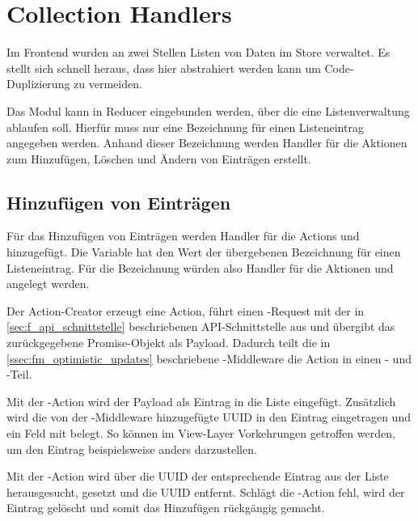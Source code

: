 \section{Collection Handlers}
\label{sec:f_collection_handlers}

Im Frontend wurden an zwei Stellen Listen von Daten im Store verwaltet.  Es
stellt sich schnell heraus, dass hier abstrahiert werden kann um
Code-Duplizierung zu vermeiden.

Das Modul  kann in Reducer eingebunden werden, über
die eine Listenverwaltung ablaufen soll.  Hierfür muss nur eine Bezeichnung für
einen Listeneintrag angegeben werden.  Anhand dieser Bezeichnung werden Handler
für die Aktionen zum Hinzufügen, Löschen und Ändern von Einträgen erstellt.

\subsection{Hinzufügen von Einträgen}
\label{ssec:fc_hinzufuegen_von_eintraegen}

Für das Hinzufügen von Einträgen werden Handler für die Actions
 und 
hinzugefügt.  Die Variable  hat den Wert der übergebenen
Bezeichnung für einen Listeneintrag.  Für die Bezeichnung  würden
also Handler für die Aktionen  und
 angelegt werden.

Der Action-Creator erzeugt eine  Action, führt einen
-Request mit der in \cref{sec:f_api_schnittstelle} beschriebenen
API-Schnittstelle aus und übergibt das zurückgegebene Promise-Objekt als
Payload.  Dadurch teilt die in \cref{ssec:fm_optimistic_updates} beschriebene
-Middleware die Action in einen - und
-Teil.

Mit der -Action wird der Payload als Eintrag in die Liste
eingefügt.  Zusätzlich wird die von der -Middleware
hinzugefügte UUID in den Eintrag eingetragen und ein Feld  mit
 belegt.  So können im View-Layer Vorkehrungen getroffen werden,
um den Eintrag beispielsweise anders darzustellen.

Mit der -Action wird über die UUID der entsprechende Eintrag
aus der Liste herausgesucht,   gesetzt und die UUID
entfernt.  Schlägt die -Action fehl, wird der Eintrag gelöscht
und somit das Hinzufügen rückgängig gemacht.

